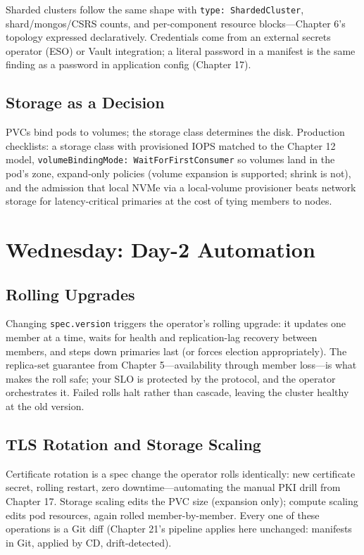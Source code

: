 Sharded clusters follow the same shape with \texttt{type: ShardedCluster}, shard/mongos/CSRS counts, and per-component resource blocks---Chapter 6's topology expressed declaratively. Credentials come from an external secrets operator (ESO) or Vault integration; a literal password in a manifest is the same finding as a password in application config (Chapter 17).

\subsection{Storage as a Decision}
PVCs bind pods to volumes; the storage class determines the disk. Production checklists: a storage class with provisioned IOPS matched to the Chapter 12 model, \texttt{volumeBindingMode: WaitForFirstConsumer} so volumes land in the pod's zone, expand-only policies (volume expansion is supported; shrink is not), and the admission that local NVMe via a local-volume provisioner beats network storage for latency-critical primaries at the cost of tying members to nodes.

\section{Wednesday: Day-2 Automation}
\subsection{Rolling Upgrades}
Changing \texttt{spec.version} triggers the operator's rolling upgrade: it updates one member at a time, waits for health and replication-lag recovery between members, and steps down primaries last (or forces election appropriately). The replica-set guarantee from Chapter 5---availability through member loss---is what makes the roll safe; your SLO is protected by the protocol, and the operator orchestrates it. Failed rolls halt rather than cascade, leaving the cluster healthy at the old version.

\subsection{TLS Rotation and Storage Scaling}
Certificate rotation is a spec change the operator rolls identically: new certificate secret, rolling restart, zero downtime---automating the manual PKI drill from Chapter 17. Storage scaling edits the PVC size (expansion only); compute scaling edits pod resources, again rolled member-by-member. Every one of these operations is a Git diff (Chapter 21's pipeline applies here unchanged: manifests in Git, applied by CD, drift-detected).

